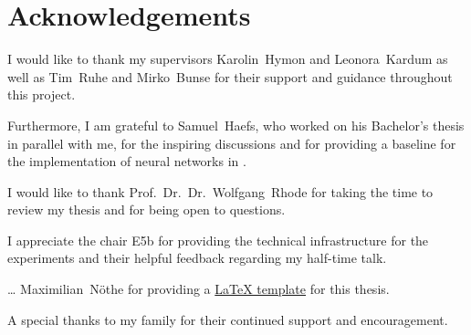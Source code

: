 \chapter*{Acknowledgements}

I would like to thank
my supervisors
  Karolin~Hymon and
  Leonora~Kardum
as well as
  Tim~Ruhe and
  Mirko~Bunse
for their support and guidance throughout this project.

Furthermore,
I am grateful to Samuel~Haefs,
  who worked on his Bachelor's thesis in parallel with me,
for the inspiring discussions
and for providing a baseline for the implementation of neural networks in \dsea.

I would like to thank Prof.~Dr.~Dr.~Wolfgang~Rhode for
  taking the time to review my thesis
  and for being open to questions.

I appreciate the chair E5b for providing the technical infrastructure for the experiments
and their helpful feedback regarding my half-time talk.

… Maximilian~Nöthe for providing a \href{https://github.com/maxnoe/tudothesis}{\LaTeX{} template} for this thesis.


A special thanks to my family for their continued support and encouragement.
